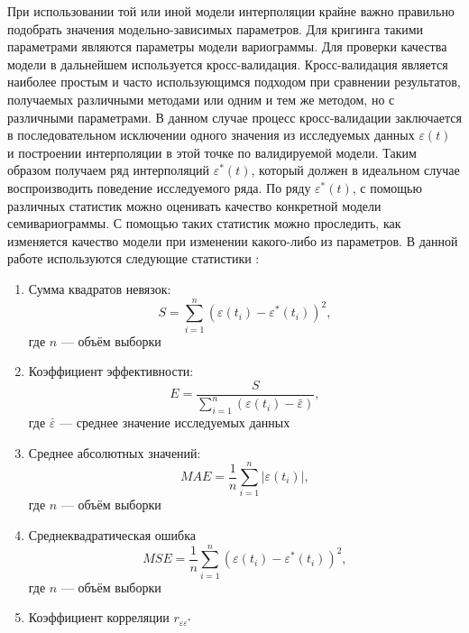 При использовании той или иной модели интерполяции крайне важно правильно подобрать значения модельно-зависимых параметров. Для кригинга такими параметрами являются параметры модели вариограммы. Для проверки качества модели в дальнейшем используется кросс-валидация. Кросс-валидация является наиболее простым и часто использующимся подходом при сравнении результатов, получаемых различными методами или одним и тем же методом, но с различными параметрами. В данном случае процесс кросс-валидации заключается в последовательном исключении одного значения из исследуемых данных $ \varepsilon(t) $ и построении интерполяции в этой точке по валидируемой модели. Таким образом получаем ряд интерполяций $ \varepsilon^{*}(t) $, который должен в идеальном случае воспроизводить поведение исследуемого ряда. По ряду $ \varepsilon^{*}(t) $, с помощью различных статистик можно оценивать качество конкретной модели семивариограммы. С помощью таких статистик можно проследить, как изменяется качество модели при изменении какого-либо из параметров. В данной работе используются следующие статистики \cite{saveliev2012}:
\begin{enumerate}
	\item Сумма квадратов невязок:
	\begin{equation*}
		S = \sum_{i = 1}^{n} (\varepsilon(t_i) - \varepsilon^{*}(t_i))^2,
	\end{equation*}
	где $ n $ --- объём выборки
	\item Коэффициент эффективности:
	\begin{equation*}
		E = \frac{S}{\sum_{i=1}^{n}(\varepsilon(t_i) - \bar{\varepsilon})},
	\end{equation*}
	где $ \bar{\varepsilon} $ --- среднее значение исследуемых данных
	\item Среднее абсолютных значений:
	\begin{equation*}
		MAE = \frac{1}{n} \sum_{i=1}^{n} | \varepsilon(t_i) |,
	\end{equation*}
	где $ n $ --- объём выборки
	\item Среднеквадратическая ошибка
	\begin{equation}
	\label{eq:mse}
		MSE = \frac{1}{n} \sum_{i=1}^{n} (\varepsilon(t_i) - \varepsilon^{*}(t_i))^2,
	\end{equation}
	где $ n $ --- объём выборки
	\item Коэффициент корреляции $ r_{\varepsilon\varepsilon^{*}} $
\end{enumerate}

